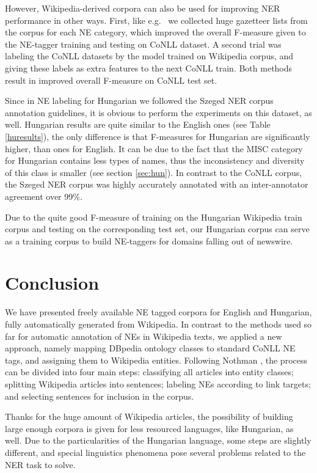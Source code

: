 \documentclass[11pt]{article}
\begin{document}
However, Wikipedia-derived corpora can also be used for improving NER performance in other ways. First, like e.g.~\cite{Toral:06} we collected huge gazetteer lists from the corpus for each NE category, which improved the overall F-measure given to the NE-tagger training and testing on CoNLL dataset. A second trial was labeling the CoNLL datasets by the model trained on Wikipedia corpus, and giving these labels as extra features to the next CoNLL train. Both methods result in improved overall F-measure on CoNLL test set.  

Since in NE labeling for Hungarian we followed the Szeged NER corpus annotation guidelines, it is obvious to perform the experiments on this dataset, as well. Hungarian results are quite similar to the English ones (see Table \ref{huresults}), the only difference is that F-measures for Hungarian are significantly higher, than ones for English. It can be due to the fact that the MISC category for Hungarian contains less types of names, thus the inconsistency and diversity of this class is smaller (see section \ref{sec:hun}). In contrast to the CoNLL corpus, the Szeged NER corpus was highly accurately annotated with an inter-annotator agreement over 99\%.  

Due to the quite good F-measure of training on the Hungarian Wikipedia train corpus and testing on the corresponding test set, our Hungarian corpus can serve as a training corpus to build NE-taggers for domains falling out of newswire. 

\section{Conclusion}
\label{sec:conclusion}

We have presented freely available NE tagged corpora for English and Hungarian, fully automatically generated from Wikipedia. In contrast to the methods used so far for automatic annotation of NEs in Wikipedia texts, we applied a new approach, namely mapping DBpedia ontology classes to standard CoNLL NE tags, and assigning them to Wikipedia entities. Following Nothman , the process can be divided into four main steps:  classifying all articles into entity classes; splitting Wikipedia articles into sentences; labeling NEs according to link targets; and selecting sentences for inclusion in the corpus. 

Thanks for the huge amount of Wikipedia articles, the possibility of building large enough corpora is given for less resourced languages, like Hungarian, as well. Due to the particularities of the Hungarian language, some steps are slightly different, and special linguistics phenomena pose several problems related to the NER task to solve. 
\end{document}
